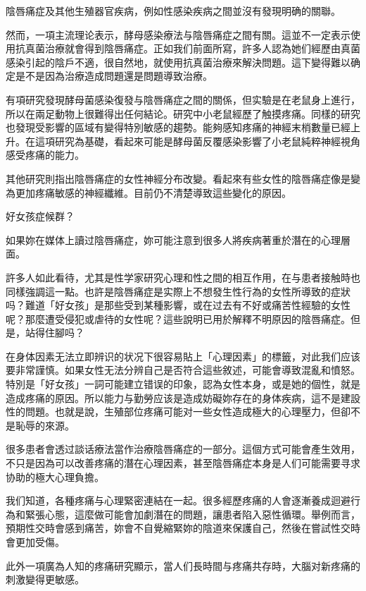 \documentclass[12pt,UTF8]{ctexbook}
\begin{document}
陰唇痛症及其他生殖器官疾病，例如性感染疾病之間並沒有發現明确的關聯。

然而，一項主流理论表示，酵母感染療法与陰唇痛症之間有關。這並不一定表示使用抗真菌治療就會得到陰唇痛症。正如我们前面所寫，許多人認為她们經歷由真菌感染引起的陰戶不適，很自然地，就使用抗真菌治療來解決問題。這下變得難以确定是不是因為治療造成問題還是問題導致治療。

有項研究發現酵母菌感染復發与陰唇痛症之間的關係，但实驗是在老鼠身上進行，所以在兩足動物上很難得出任何結论。研究中小老鼠經歷了触摸疼痛。同樣的研究也發現受影響的區域有變得特別敏感的趨勢。能夠感知疼痛的神經末梢數量已經上升。在這項研究為基礎，看起來可能是酵母菌反覆感染影響了小老鼠純粹神經視角感受疼痛的能力。

其他研究則指出陰唇痛症的女性神經分布改變。看起來有些女性的陰唇痛症像是變為更加疼痛敏感的神經纖維。目前仍不清楚導致這些變化的原因。





好女孩症候群？




如果妳在媒体上讀过陰唇痛症，妳可能注意到很多人將疾病著重於潛在的心理層面。

許多人如此看待，尤其是性学家研究心理和性之間的相互作用，在与患者接触時也同樣強調這一點。也許是陰唇痛症是实際上不想發生性行為的女性所導致的症狀吗？難道「好女孩」是那些受到某種影響，或在过去有不好或痛苦性經驗的女性呢？那麼遭受侵犯或虐待的女性呢？這些說明已用於解釋不明原因的陰唇痛症。但是，站得住腳吗？





在身体因素无法立即辨识的状况下很容易貼上「心理因素」的標籤，对此我们应该要非常謹慎。如果女性无法分辨自己是否符合這些敘述，可能會導致混亂和憤怒。特別是「好女孩」一詞可能建立错误的印象，認為女性本身，或是她的個性，就是造成疼痛的原因。所以能力与勤勞应该是造成妨礙妳存在的身体疾病，這不是建設性的問題。也就是說，生殖部位疼痛可能对一些女性造成極大的心理壓力，但卻不是恥辱的來源。

很多患者會透过談话療法當作治療陰唇痛症的一部分。這個方式可能會產生效用，不只是因為可以改善疼痛的潛在心理因素，甚至陰唇痛症本身是人们可能需要寻求协助的極大心理負擔。

我们知道，各種疼痛与心理緊密連結在一起。很多經歷疼痛的人會逐漸養成迴避行為和緊張心態，這麼做可能會加劇潛在的問題，讓患者陷入惡性循環。舉例而言，預期性交時會感到痛苦，妳會不自覺縮緊妳的陰道來保護自己，然後在嘗試性交時會更加受傷。

此外一項廣為人知的疼痛研究顯示，當人们長時間与疼痛共存時，大腦对新疼痛的刺激變得更敏感。
\end{document}
